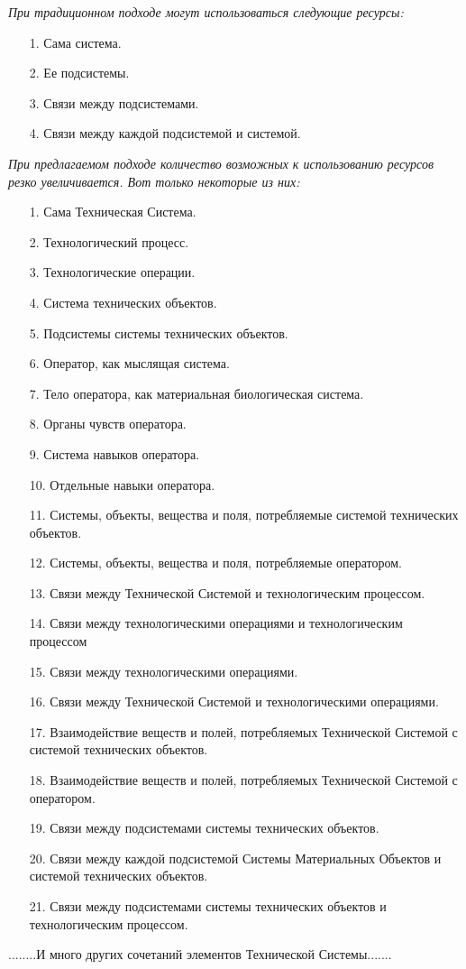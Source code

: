 \documentclass[11pt,a4paper]{article}
\begin{document}
\emph{При традиционном подходе могут использоваться следующие ресурсы:}
\begin{itemize}
\item[1.] Сама система.
\item[2.] Ее подсистемы.
\item[3.] Связи между подсистемами.
\item[4.] Связи между каждой подсистемой и системой.
\end{itemize}
\emph{При предлагаемом подходе количество возможных к использованию ресурсов
  резко увеличивается.  Вот только некоторые из них: }
\begin{itemize}
\item[1.] Сама Техническая Система.
\item[2.] Технологический процесс.
\item[3.] Технологические операции.
\item[4.] Система технических объектов.
\item[5.] Подсистемы системы технических объектов.
\item[6.] Оператор, как мыслящая система.
\item[7.] Тело оператора, как материальная биологическая система.
\item[8.] Органы чувств оператора.
\item[9.] Система навыков оператора.
\item[10.] Отдельные навыки оператора.
\item[11.] Системы, объекты, вещества и поля, потребляемые системой
  технических объектов.
\item[12.] Системы, объекты, вещества и поля, потребляемые оператором.
\item[13.] Связи между Технической Системой и технологическим процессом.
\item[14.] Связи между технологическими операциями и технологическим процессом
\item[15.] Связи между технологическими операциями.
\item[16.] Связи между Технической Системой и технологическими операциями.
\item[17.] Взаимодействие веществ и полей, потребляемых Технической Системой с
  системой технических объектов.
\item[18.] Взаимодействие веществ и полей, потребляемых Технической Системой с
  оператором.
\item[19.] Связи между подсистемами системы технических объектов.
\item[20.] Связи между каждой подсистемой Системы Материальных Объектов и
  системой технических объектов.
\item[21.] Связи между подсистемами системы технических объектов и
  технологическим процессом.
\end{itemize}
........И много других сочетаний элементов Технической Системы.......
\end{document}
